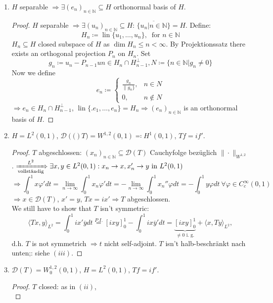 \documentclass[12pt]{extreport} %
\newcommand{\N}{\mathbb{N}}
\newcommand{\DO}[1]{\mathcal{D}\left( {#1} \right)}
\theoremstyle{named}
\theoremstyle{nnamed}
\theoremstyle{itshape}
\theoremstyle{normal}
\begin{document}
\begin{enumerate}
	\item $H$ separable $\Rightarrow \exists (e_n)_{n \in \N} \subseteq H$ orthonormal basis of $H$.
		\begin{proof}
			$H$ separable $\Rightarrow \exists (u_n)_{n \in \N} \subseteq H$: $\overline{ \{ u_n | n \in \N \}} = H$. Define:
			$$ H_n \coloneqq \operatorname{lin} \{ u_1, \dotsc, u_n \}, ~ \text{ for } n \in \N $$
			$H_n \subseteq H$ closed subspace of $H$ as $\dim H_n \leq n < \infty$.
			By Projektionssatz there exists an orthogonal projection $P_n$ on $H_n$. Set
			$$ g_n \coloneqq u_n - P_{n-1} un \in H_{n} \cap H_{n-1}^{\perp}, N \coloneqq \{ n \in \N | g_n \neq 0 \} $$
			Now we define 
			$$ e_n \coloneqq \begin{cases} \frac{g_{n}}{\| g_n \}}, & n \in N \\ 0, & n \notin N \end{cases} $$
			$\Rightarrow e_n \in H_n \cap H_{n-1}^{\perp}$, $\operatorname{lin}\{. e_1, \dotsc, e_n \} = H_n \Rightarrow (e_n)_{n \in \N}$ is an orthonormal basis of $H$.
		\end{proof}
	\item $H = L^2(0, 1)$, $\DO(T) = W^{1,2}(0, 1) \eqqcolon H^{1}(0,1)$, $T f = i f'$.
		\begin{proof}
			$T$ abgeschlossen: $(x_n)_{n \in \N} \subseteq \DO{T}$ Cauchyfolge bezüglich $\| \cdot \|_{W^{1,2}}$. $\xRightarrow[\text{vollständig}]{L^2} \exists x, y \in L^2(0,1): x_n \rightarrow x, x_n' \rightarrow y \text{ in } L^{2}(0,1)$
			$$ \Rightarrow \int_0^1 x \varphi' dt = \lim_{n \rightarrow \infty} \int_0^1 x_n \varphi' dt = - \lim_{n \rightarrow \infty} \int_0^1 x_n'' \varphi dt = - \int_0^1 y \varphi dt ~\forall \varphi \in C_c^{\infty}(0,1) $$
			$\Rightarrow x \in \DO{T}$, $x' = y$, $T x = i x' \Rightarrow T$ abgeschlossen. ~\\
			We still have to show that $T$ isn't symmetric:
			$$ \langle  Tx, y \rangle_{L^2} = \int_0^1 i x' \overline{y} dt \overset{P.I.} {=}[ixy]_0^1 - \int_0^1 i x \overline{y}' dt = \underbrace{[ixy]_0^1}_{\neq 0 \text{ i. g.}} + \langle x, Ty \rangle_{L^2},$$
			d.h. $T$ is not symmetrich $\Rightarrow t$ nicht self-adjoint. $T$ isn't halb-beschränkt nach unten;: siehe $(iii)$.
		\end{proof}
	\item $\DO{T} = W_0^{1,2}(0,1)$, $H = L^{2}(0, 1)$, $Tf = if'$. 
		\begin{proof}
			$T$ closed: as in $(ii)$, ~\\

\end{proof}
\end{enumerate}
\end{document}
